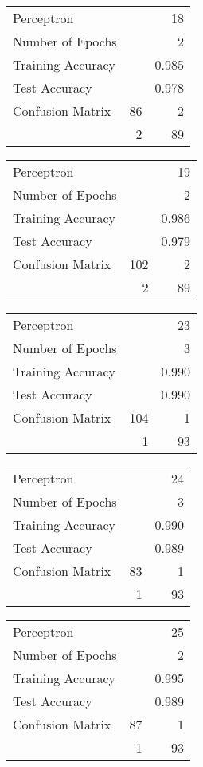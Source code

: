 \documentclass[11pt,twocolumn]{article}
\begin{document}
\begin{center}
\begin{tabular}{l | r r}
Perceptron &&18\\
Number of Epochs & &2\\
Training Accuracy & &0.985\\
Test Accuracy & &0.978\\
Confusion Matrix &86 & 2\\
 &2 & 89\\
\end{tabular}
\end{center}
\begin{center}
\begin{tabular}{l | r r}
Perceptron &&19\\
Number of Epochs & &2\\
Training Accuracy & &0.986\\
Test Accuracy & &0.979\\
Confusion Matrix &102 & 2\\
 &2 & 89\\
\end{tabular}
\end{center}
\begin{center}
\begin{tabular}{l | r r}
Perceptron &&23\\
Number of Epochs & &3\\
Training Accuracy & &0.990\\
Test Accuracy & &0.990\\
Confusion Matrix &104 & 1\\
 &1 & 93\\
\end{tabular}
\end{center}
\begin{center}
\begin{tabular}{l | r r}
Perceptron &&24\\
Number of Epochs & &3\\
Training Accuracy & &0.990\\
Test Accuracy & &0.989\\
Confusion Matrix &83 & 1\\
 &1 & 93\\
\end{tabular}
\end{center}
\begin{center}
\begin{tabular}{l | r r}
Perceptron &&25\\
Number of Epochs & &2\\
Training Accuracy & &0.995\\
Test Accuracy & &0.989\\
Confusion Matrix &87 & 1\\
 &1 & 93\\
\end{tabular}
\end{center}
\end{document}
